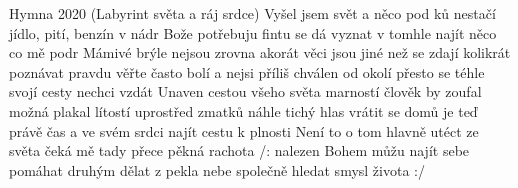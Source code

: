 \begin{TEXT}{Hymna 2020 (Labyrint světa a ráj srdce)}
\SLOKA Vyšel jsem  svět a něco  pod ků\NL
nestačí jídlo, pití, benzín v nádr\NL
{} Bože potřebuju  fintu\NL
{} se dá vyznat v tomhle \NL
{} najít něco co mě  podr   \NL
\SLOKA Mámivé brýle nejsou zrovna akorát\NL
věci jsou jiné než se zdají kolikrát\NL
poznávat pravdu věřte často bolí\NL
a nejsi příliš chválen od okolí\NL
přesto se téhle svojí cesty nechci vzdát\NL
\SLOKA Unaven cestou všeho světa marností\NL
člověk by zoufal možná plakal lítostí\NL
uprostřed zmatků náhle tichý hlas\NL
vrátit se domů je teď právě čas\NL
a ve svém srdci najít cestu k plnosti\NL
\SLOKA Není to o tom hlavně utéct ze světa\NL
čeká mě tady přece pěkná rachota\NL
/: nalezen Bohem můžu najít sebe\NL
pomáhat druhým dělat z pekla nebe\NL
společně hledat smysl života :/\NL
\end{TEXT}
